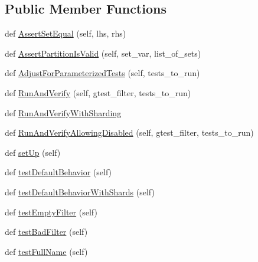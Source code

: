 \subsection*{Public Member Functions}
\begin{DoxyCompactItemize}
\item 
def \hyperlink{classgtest__filter__unittest_1_1_g_test_filter_unit_test_aeebdbdcc59594ad0a69cf11eafe94997}{Assert\+Set\+Equal} (self, lhs, rhs)
\item 
def \hyperlink{classgtest__filter__unittest_1_1_g_test_filter_unit_test_a87656eac0cf4136252eef43da0121381}{Assert\+Partition\+Is\+Valid} (self, set\+\_\+var, list\+\_\+of\+\_\+sets)
\item 
def \hyperlink{classgtest__filter__unittest_1_1_g_test_filter_unit_test_a11c48bf404bca6806b14a1a71d169ace}{Adjust\+For\+Parameterized\+Tests} (self, tests\+\_\+to\+\_\+run)
\item 
def \hyperlink{classgtest__filter__unittest_1_1_g_test_filter_unit_test_acf341ed9a265b346a050afa9a9a85c65}{Run\+And\+Verify} (self, gtest\+\_\+filter, tests\+\_\+to\+\_\+run)
\item 
def \hyperlink{classgtest__filter__unittest_1_1_g_test_filter_unit_test_a6d37b9fb87437097a5d5794ec2ba522e}{Run\+And\+Verify\+With\+Sharding}
\item 
def \hyperlink{classgtest__filter__unittest_1_1_g_test_filter_unit_test_ae52bd70ef1dcb68c83c0379ddfb987a9}{Run\+And\+Verify\+Allowing\+Disabled} (self, gtest\+\_\+filter, tests\+\_\+to\+\_\+run)
\item 
def \hyperlink{classgtest__filter__unittest_1_1_g_test_filter_unit_test_af20a71b1659314a5cc1093d77a673495}{set\+Up} (self)
\item 
def \hyperlink{classgtest__filter__unittest_1_1_g_test_filter_unit_test_adef3a9b539c73bda785a631a5aac424f}{test\+Default\+Behavior} (self)
\item 
def \hyperlink{classgtest__filter__unittest_1_1_g_test_filter_unit_test_a8d5ad564f41c052864a3957a71daa535}{test\+Default\+Behavior\+With\+Shards} (self)
\item 
def \hyperlink{classgtest__filter__unittest_1_1_g_test_filter_unit_test_afce65847b463ec5bca4458e9348d9a9f}{test\+Empty\+Filter} (self)
\item 
def \hyperlink{classgtest__filter__unittest_1_1_g_test_filter_unit_test_a2456062c177350a53244aea030aaf617}{test\+Bad\+Filter} (self)
\item 
def \hyperlink{classgtest__filter__unittest_1_1_g_test_filter_unit_test_a336d9203e26493bae11fbb514af38a6b}{test\+Full\+Name} (self)

\end{DoxyCompactItemize}
